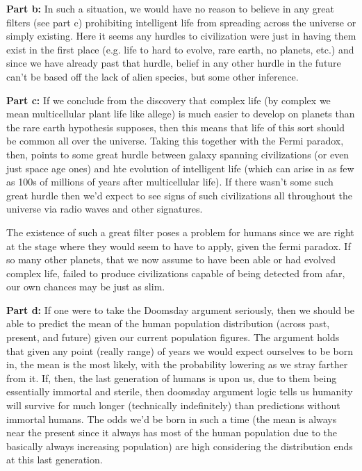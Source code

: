 \documentclass{article}
\begin{document}
\noindent\textbf{Part b:} In such a situation, we would have no reason to believe in any great filters (see part c) prohibiting intelligent life from spreading across the universe or simply existing. Here it seems any hurdles to civilization were just in having them exist in the first place (e.g. life to hard to evolve, rare earth, no planets, etc.) and since we have already past that hurdle, belief in any other hurdle in the future can't be based off the lack of alien species, but some other inference.
\bigskip

\noindent\textbf{Part c:} If we conclude from the discovery that complex life (by complex we mean multicellular plant life like allege) is much easier to develop on planets than the rare earth hypothesis supposes, then this means that life of this sort should be common all over the universe. Taking this together with the Fermi paradox, then, points to some great hurdle between galaxy spanning civilizations (or even just space age ones) and hte evolution of intelligent life (which can arise in as few as 100s of millions of years after multicellular life). If there wasn't some such great hurdle then we'd expect to see signs of such civilizations all throughout the universe via radio waves and other signatures.

The existence of such a great filter poses a problem for humans since we are right at the stage where they would seem to have to apply, given the fermi paradox. If so many other planets, that we now assume to have been able or had evolved complex life, failed to produce civilizations capable of being detected from afar, our own chances may be just as slim.
\bigskip

\noindent\textbf{Part d:} If one were to take the Doomsday argument seriously, then we should be able to predict the mean of the human population distribution (across past, present, and future) given our current population figures. The argument holds that given any point (really range) of years we would expect ourselves to be born in, the mean is the most likely, with the probability lowering as we stray farther from it. If, then, the last generation of humans is upon us, due to them being essentially immortal and sterile, then doomsday argument logic tells us humanity will survive for much longer (technically indefinitely) than predictions without immortal humans. The odds we'd be born in such a time (the mean is always near the present since it always has most of the human population due to the basically always increasing population) are high considering the distribution ends at this last generation.
\bigskip
\end{document}
